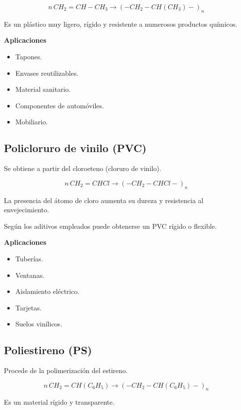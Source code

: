 \[
n\,CH_2=CH-CH_3
\longrightarrow
(-CH_2-CH(CH_3)-)_n
\]

Es un plástico muy ligero, rígido y resistente a numerosos productos químicos.

\textbf{Aplicaciones}

\begin{itemize}
\item Tapones.
\item Envases reutilizables.
\item Material sanitario.
\item Componentes de automóviles.
\item Mobiliario.
\end{itemize}


\subsection{Policloruro de vinilo (PVC)}

Se obtiene a partir del cloroeteno (cloruro de vinilo).

\[
n\,CH_2=CHCl
\longrightarrow
(-CH_2-CHCl-)_n
\]

La presencia del átomo de cloro aumenta su dureza y resistencia al envejecimiento.

Según los aditivos empleados puede obtenerse un PVC rígido o flexible.

\textbf{Aplicaciones}

\begin{itemize}
\item Tuberías.
\item Ventanas.
\item Aislamiento eléctrico.
\item Tarjetas.
\item Suelos vinílicos.
\end{itemize}


\subsection{Poliestireno (PS)}

Procede de la polimerización del estireno.

\[
n\,CH_2=CH(C_6H_5)
\longrightarrow
(-CH_2-CH(C_6H_5)-)_n
\]

Es un material rígido y transparente.

